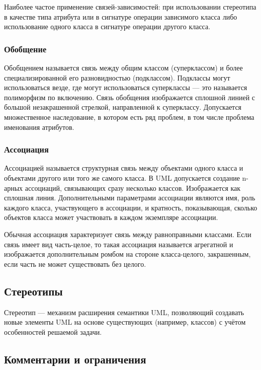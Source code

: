 \documentclass[a4paper,12pt]{article}
\begin{document}
Наиболее частое применение связей-зависимостей: при использовании стереотипа в качестве типа атрибута или в сигнатуре операции зависимого класса либо использование одного класса в сигнатуре операции другого класса.

\subsubsection{Обобщение}

Обобщением называется связь между общим классом (суперклассом) и более специализированной его разновидностью (подклассом). Подклассы могут использоваться везде, где могут использоваться суперклассы — это называется полиморфизм по включению. Связь обобщения изображается сплошной линией с большой незакрашенной стрелкой, направленной к суперклассу. Допускается множественное наследование, в котором есть ряд проблем, в том числе проблема именования атрибутов.

\subsubsection{Ассоциация}

Ассоциацией называется структурная связь между объектами одного класса и объектами другого или того же самого класса. В UML допускается создание n-арных ассоциаций, связывающих сразу несколько классов. Изображается как сплошная линия. Дополнительными параметрами ассоциации являются имя, роль каждого класса, участвующего в ассоциации, и кратность, показывающая, сколько объектов класса может участвовать в каждом экземпляре ассоциации.

Обычная ассоциация характеризует связь между равноправными классами. Если связь имеет вид часть-целое, то такая ассоциация называется агрегатной и изображается дополнительным ромбом на стороне класса-целого, закрашенным, если часть не может существовать без целого.

\subsection{Стереотипы}

Стереотип — механизм расширения семантики UML, позволяющий создавать новые элементы UML на основе существующих (например, классов) с учётом особенностей решаемой задачи.

\subsection{Комментарии и ограничения}
\end{document}
